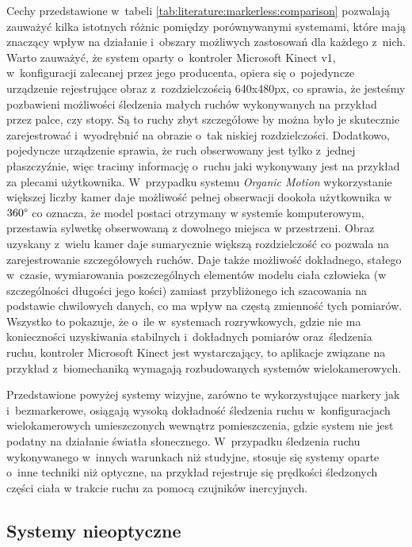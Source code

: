 Cechy przedstawione w~tabeli \ref{tab:literature:markerless:comparison} pozwalają zauważyć kilka istotnych różnic pomiędzy porównywanymi systemami, które mają znaczący wpływ na działanie i~obszary możliwych zastosowań dla każdego z~nich. Warto zauważyć, że system oparty o~kontroler Microsoft Kinect v1, w~konfiguracji zalecanej przez jego producenta, opiera się o~pojedyncze urządzenie rejestrujące obraz z~rozdzielczością 640x480px, co sprawia, że jesteśmy pozbawieni możliwości śledzenia małych ruchów wykonywanych na przykład przez palce, czy stopy. Są to ruchy zbyt szczegółowe by można było je skutecznie zarejestrować i~wyodrębnić na obrazie o~tak niskiej rozdzielczości. Dodatkowo, pojedyncze urządzenie sprawia, że ruch obserwowany jest tylko z~jednej płaszczyźnie, więc tracimy informację o~ruchu jaki wykonywany jest na przykład za plecami użytkownika. W~przypadku systemu \emph{Organic Motion} wykorzystanie większej liczby kamer daje możliwość pełnej obserwacji dookoła użytkownika w~$360\degree$ co oznacza, że model postaci otrzymany w systemie komputerowym, przestawia sylwetkę obserwowaną z dowolnego miejsca w przestrzeni. Obraz uzyskany z~wielu kamer daje sumarycznie większą rozdzielczość co pozwala na zarejestrowanie szczegółowych ruchów. Daje także możliwość dokładnego, stałego w~czasie, wymiarowania poszczególnych elementów modelu ciała człowieka (w szczególności długości jego kości) zamiast przybliżonego ich szacowania na podstawie chwilowych danych, co ma wpływ na częstą zmienność tych pomiarów. Wszystko to pokazuje, że o~ile w~systemach rozrywkowych, gdzie nie ma konieczności uzyskiwania stabilnych i~dokładnych pomiarów oraz~śledzenia ruchu, kontroler Microsoft Kinect jest wystarczający, to aplikacje związane na przykład z~biomechaniką wymagają rozbudowanych systemów wielokamerowych.
			
Przedstawione powyżej systemy wizyjne, zarówno te wykorzystujące markery jak i~bezmarkerowe, osiągają wysoką dokładność śledzenia ruchu w~konfiguracjach wielokamerowych umieszczonych wewnątrz pomieszczenia, gdzie system nie jest podatny na działanie światła słonecznego. W~przypadku śledzenia ruchu wykonywanego w~innych warunkach niż studyjne, stosuje się systemy oparte o~inne techniki niż optyczne, na przykład rejestruje się prędkości śledzonych części ciała w trakcie ruchu za pomocą czujników inercyjnych.
			
\subsection{Systemy nieoptyczne}
			
